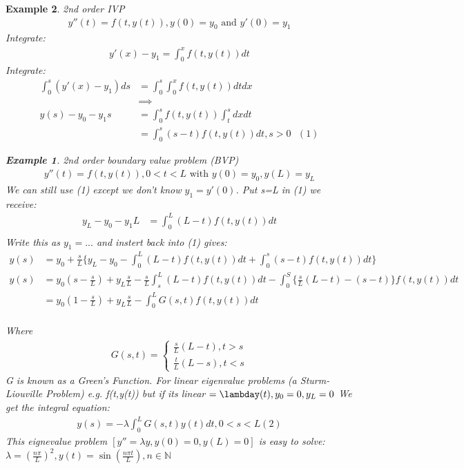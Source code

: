 \documentclass[10pt, oneside]{article}
\newcommand{\N}{\mathbb{N}}
\newtheorem{example}{Example}
\begin{document}
\begin{example}
2nd order IVP
\begin{align*}
    y''(t) = f(t,y(t)), y(0) = y_{0} \text{ and } y'(0) = y_{1} 
\end{align*}
Integrate:
\begin{align*}
    y'(x) - y_{1} = \int_{0}^{x}f(t,y(t))dt
\end{align*}
Integrate:
\begin{align*}
    \int_{0}^{s}(y'(x) - y_{1})ds &= \int_{0}^{s}\int_{0}^{x}f(t,y(t))dt dx \\
    & \implies \\
    y(s) - y_{0} - y_{1} s & = \int_{0}^{s}f(t,y(t))\int_{t}^{s}  dx dt\\
    & = \int_{0}^{s}(s-t)f(t,y(t))dt, s> 0\text{    } (1) 
\end{align*}
\begin{example}
    2nd order boundary value problem (BVP)
    \begin{align*}
        y''(t) =f(t,y(t)), 0<t<L \text{ with } y(0) = y_{0}, y(L) = y_{L}
    \end{align*}
    We can still use (1) except we don't know $y_{1} = y'(0)$. Put s=L in (1) we receive:
    \begin{align*}
        y_{L} - y_{0} - y_{1} L & = \int_{0}^{L}(L-t)f(t,y(t))dt \\
    \end{align*}
    Write this as $y_{1} = ...$ and instert back into (1) gives:
    \begin{align*}
        y(s) & = y_{0} + \frac{s}{L} \{ y_{L} - y_{0} - \int_{0}^{L}(L-t) f(t,y(t))dt + \int_{0}^{s}(s-t) f(t,y(t))dt\} \\
        y(s) & = y_{0}(s-\frac{s}{L})+ y_{L}\frac{s}{L}  - \frac{s}{L} \int_{s}^{L} (L-t)f(t,y(t))dt - \int_{0}^{S}\{\frac{s}{L}(L-t) - (s-t)\} f(t,y(t))dt \\
        & = y_{0} (1-\frac{s}{L}) + y_{L} \frac{s}{L} - \int_{0}^{L}G(s,t)f(t,y(t))dt \\
    \end{align*}
\end{example}
Where 
\begin{align*}
    G(s,t) = \begin{cases} \frac{s}{L}(L-t) , t > s \\
        \frac{t}{L}(L-s), t < s \end{cases}
\end{align*}
G is known as a Green's Function.
For linear eigenvalue problems (a Sturm-Liouville Problem) e.g. f(t,y(t)) but if its linear $=\lambday(t), y_{0} =0, y_{L} = 0$ We get the integral equation:
\begin{align*}
    y(s) = -\lambda \int_{0}^{L}G(s,t)y(t)dt, 0 < s < L (2)
\end{align*}
This eignevalue problem $[y''=\lambda y, y(0)=0, y(L) =0]$ is easy to solve:
$\lambda = (\frac{n \pi}{L})^{2}, y(t) = \sin(\frac{n \pi t}{L}), n \in \N$
\end{example}
\end{document}
